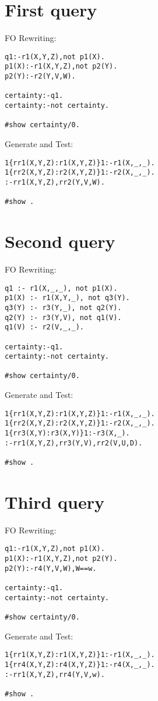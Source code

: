 
\section{First query}

FO Rewriting:
\begin{lstlisting}
q1:-r1(X,Y,Z),not p1(X).
p1(X):-r1(X,Y,Z),not p2(Y).
p2(Y):-r2(Y,V,W).

certainty:-q1.
certainty:-not certainty.

#show certainty/0.
\end{lstlisting}

Generate and Test:
\begin{lstlisting}
1{rr1(X,Y,Z):r1(X,Y,Z)}1:-r1(X,_,_).
1{rr2(X,Y,Z):r2(X,Y,Z)}1:-r2(X,_,_).
:-rr1(X,Y,Z),rr2(Y,V,W).

#show .
\end{lstlisting}


\section{Second query}


FO Rewriting:
\begin{lstlisting}
q1 :- r1(X,_,_), not p1(X).
p1(X) :- r1(X,Y,_), not q3(Y).
q3(Y) :- r3(Y,_), not q2(Y).
q2(Y) :- r3(Y,V), not q1(V).
q1(V) :- r2(V,_,_).

certainty:-q1.
certainty:-not certainty.

#show certainty/0.
\end{lstlisting}

Generate and Test:
\begin{lstlisting}
1{rr1(X,Y,Z):r1(X,Y,Z)}1:-r1(X,_,_).
1{rr2(X,Y,Z):r2(X,Y,Z)}1:-r2(X,_,_).
1{rr3(X,Y):r3(X,Y)}1:-r3(X,_).
:-rr1(X,Y,Z),rr3(Y,V),rr2(V,U,D).

#show .
\end{lstlisting}


\section{Third query}

FO Rewriting:
\begin{lstlisting}
q1:-r1(X,Y,Z),not p1(X).
p1(X):-r1(X,Y,Z),not p2(Y).
p2(Y):-r4(Y,V,W),W==w.

certainty:-q1.
certainty:-not certainty.

#show certainty/0.
\end{lstlisting}

Generate and Test:
\begin{lstlisting}
1{rr1(X,Y,Z):r1(X,Y,Z)}1:-r1(X,_,_).
1{rr4(X,Y,Z):r4(X,Y,Z)}1:-r4(X,_,_).
:-rr1(X,Y,Z),rr4(Y,V,w).

#show .
\end{lstlisting}
